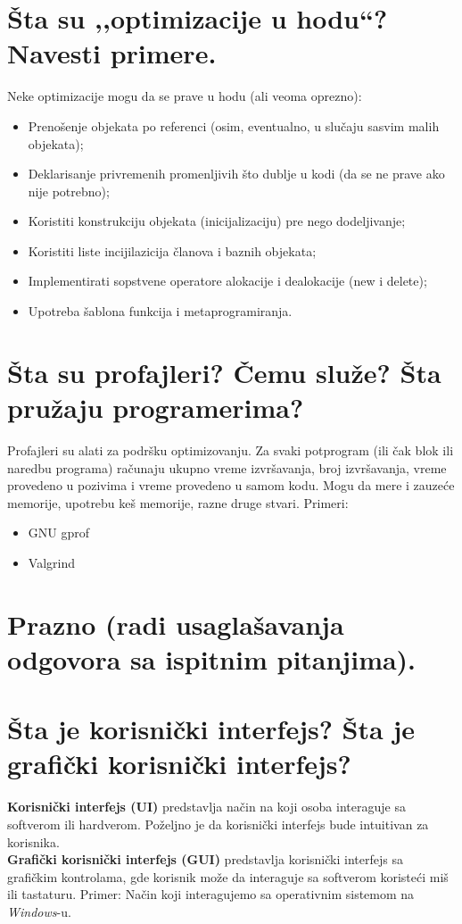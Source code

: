 \documentclass[a4paper]{article}
\begin{document}
\section{Šta su ,,optimizacije u hodu``? Navesti primere.}
  
  Neke optimizacije mogu da se prave u hodu (ali veoma oprezno):
  \begin{itemize}
    \item Prenošenje objekata po referenci (osim, eventualno, u slučaju sasvim malih objekata);
    \item Deklarisanje privremenih promenljivih što dublje u kodi (da se ne prave ako nije potrebno);
    \item Koristiti konstrukciju objekata (inicijalizaciju) pre nego dodeljivanje;
    \item Koristiti liste incijilazicija članova i baznih objekata;
    \item Implementirati sopstvene operatore alokacije i dealokacije (new i delete);
    \item Upotreba šablona funkcija i metaprogramiranja.
  \end{itemize}
\section{Šta su profajleri? Čemu služe? Šta pružaju programerima?}
  Profajleri su alati za podršku optimizovanju. Za svaki potprogram 
  (ili čak blok ili naredbu programa) računaju ukupno vreme izvršavanja, 
  broj izvršavanja, vreme provedeno u pozivima i vreme provedeno u samom kodu.
  Mogu da mere i zauzeće memorije, upotrebu keš memorije, razne druge stvari. Primeri:
  \begin{itemize}
    \item GNU gprof
    \item Valgrind
  \end{itemize}

\section{Prazno (radi usaglašavanja odgovora sa ispitnim pitanjima).}

\section{Šta je korisnički interfejs? Šta je grafički korisnički interfejs?}
  \textbf{Korisnički interfejs (UI)} predstavlja način na koji osoba interaguje sa 
  softverom ili hardverom. Poželjno je da korisnički interfejs bude intuitivan za
  korisnika. \\
  \indent \textbf{Grafički korisnički interfejs (GUI)} predstavlja korisnički interfejs
  sa grafičkim kontrolama, gde korisnik može da interaguje sa softverom koristeći
  miš ili tastaturu. Primer: Način koji interagujemo sa operativnim sistemom na \textit{Windows}-u.
\end{document}
